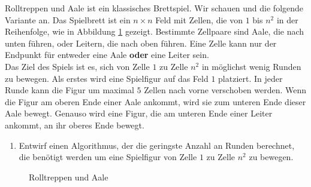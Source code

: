 \documentclass{uebung_cs}
\begin{document}
\begin{aufgabe}
	Rolltreppen und Aale ist ein klassisches Brettspiel.
	Wir schauen und die folgende Variante an.
	Das Spielbrett ist ein $n \times n$ Feld mit Zellen, die von $1$ bis $n^2$ in der Reihenfolge, wie in Abbildung \ref{snakesladders} gezeigt.
	Bestimmte Zellpaare sind Aale, die nach unten führen, oder Leitern, die nach oben führen.
	Eine Zelle kann nur der Endpunkt für entweder eine Aale \textbf{oder} eine Leiter sein.\\
	Das Ziel des Spiels ist es, sich von Zelle $1$ zu Zelle $n^2$ in möglichst wenig Runden zu bewegen.
	Als erstes wird eine Spielfigur auf das Feld $1$ platziert.
	In jeder Runde kann die Figur um maximal $5$ Zellen nach vorne verschoben werden.
	Wenn die Figur am oberen Ende einer Aale ankommt, wird sie zum unteren Ende dieser Aale bewegt.
	Genauso wird eine Figur, die am unteren Ende einer Leiter ankommt, an ihr oberes Ende bewegt.
	\begin{enumerate}
		\item Entwirf einen Algorithmus, der die geringste Anzahl an Runden berechnet, die benötigt werden um eine Spielfigur von Zelle $1$ zu Zelle $n^2$ zu bewegen.
	\end{enumerate}
	\begin{center}
		\begin{figure}
			\hspace*{\fill}	
			\hspace*{\fill}	
			\caption{Rolltreppen und Aale}
			\label{snakesladders}
		\end{figure}
	\end{center}
\end{aufgabe}
\end{document}
